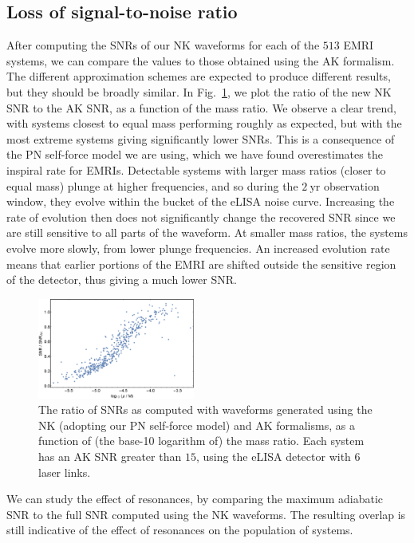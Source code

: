 \documentclass[aps,prd,amsfonts,amssymb,amsmath,nofootinbib,showpacs,superscriptaddress,twocolumn]{revtex4}
\newcommand{\figref}[1]{Fig.~\ref{fig:#1}}
\newcommand{\units}[1]{\ensuremath{~\mathrm{#1}}}
\begin{document}
\subsection{Loss of signal-to-noise ratio}
\label{sec:population-SNR}

After computing the SNRs of our NK waveforms for each of the $513$ EMRI systems, we can compare the values to those obtained using the AK formalism. The different approximation schemes are expected to produce different results, but they should be broadly similar. In \figref{pop-SNR-vs-eta}, we plot the ratio of the new NK SNR to the AK SNR, as a function of the mass ratio. We observe a clear trend, with systems closest to equal mass performing roughly as expected, but with the most extreme systems giving significantly lower SNRs. This is a consequence of the PN self-force model we are using, which we have found overestimates the inspiral rate for EMRIs. Detectable systems with larger mass ratios (closer to equal mass) plunge at higher frequencies, and so during the $2\units{yr}$ observation window, they evolve within the bucket of the eLISA noise curve. Increasing the rate of evolution then does not significantly change the recovered SNR since we are still sensitive to all parts of the waveform. At smaller mass ratios, the systems evolve more slowly, from lower plunge frequencies. An increased evolution rate means that earlier portions of the EMRI are shifted outside the sensitive region of the detector, thus giving a much lower SNR.

\begin{figure}
\centering
\includegraphics[width=0.46\textwidth]{pop_SNR_vs_eta}
\caption{\label{fig:pop-SNR-vs-eta}The ratio of SNRs as computed with waveforms generated using the NK (adopting our PN self-force model) and AK formalisms, as a function of (the base-10 logarithm of) the mass ratio. Each system has an AK SNR greater than $15$, using the eLISA detector with 6 laser links.}
\end{figure}

We can study the effect of resonances, by comparing the maximum adiabatic SNR to the full SNR computed using the NK waveforms. The resulting overlap is still indicative of the effect of resonances on the population of systems.
\end{document}

